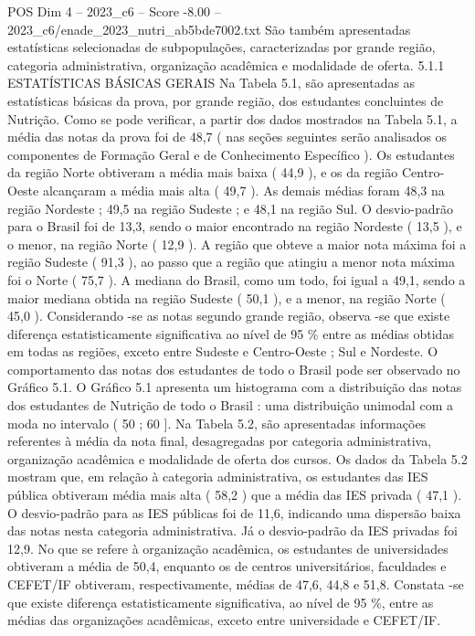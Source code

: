 \begin{textsample}{POS Dim 4 – 2023\_c6 – Score -8.00 – 2023\_c6/enade\_2023\_nutri\_ab5bde7002.txt}
São também apresentadas estatísticas selecionadas de subpopulações, caracterizadas por grande região, categoria administrativa, organização acadêmica e modalidade de oferta. 5.1.1 ESTATÍSTICAS BÁSICAS GERAIS Na Tabela 5.1, são apresentadas as estatísticas básicas da prova, por grande região, dos estudantes concluintes de Nutrição.
Como se pode verificar, a partir dos dados mostrados na Tabela 5.1, a média das notas da prova foi de 48,7 ( nas seções seguintes serão analisados os componentes de Formação Geral e de Conhecimento Específico ).
Os estudantes da região Norte obtiveram a média mais baixa ( 44,9 ), e os da região Centro-Oeste alcançaram a média mais alta ( 49,7 ).
As demais médias foram 48,3 na região Nordeste ; 49,5 na região Sudeste ; e 48,1 na região Sul.
O desvio-padrão para o Brasil foi de 13,3, sendo o maior encontrado na região Nordeste ( 13,5 ), e o menor, na região Norte ( 12,9 ).
A região que obteve a maior nota máxima foi a região Sudeste ( 91,3 ), ao passo que a região que atingiu a menor nota máxima foi o Norte ( 75,7 ).
A mediana do Brasil, como um todo, foi igual a 49,1, sendo a maior mediana obtida na região Sudeste ( 50,1 ), e a menor, na região Norte ( 45,0 ).
Considerando -se as notas segundo grande região, observa -se que existe diferença estatisticamente significativa ao nível de 95 \% entre as médias obtidas em todas as regiões, exceto entre Sudeste e Centro-Oeste ; Sul e Nordeste.
O comportamento das notas dos estudantes de todo o Brasil pode ser observado no Gráfico 5.1.
O Gráfico 5.1 apresenta um histograma com a distribuição das notas dos estudantes de Nutrição de todo o Brasil : uma distribuição unimodal com a moda no intervalo ( 50 ; 60 ].
Na Tabela 5.2, são apresentadas informações referentes à média da nota final, desagregadas por categoria administrativa, organização acadêmica e modalidade de oferta dos cursos.
Os dados da Tabela 5.2 mostram que, em relação à categoria administrativa, os estudantes das IES pública obtiveram média mais alta ( 58,2 ) que a média das IES privada ( 47,1 ).
O desvio-padrão para as IES públicas foi de 11,6, indicando uma dispersão baixa das notas nesta categoria administrativa.
Já o desvio-padrão da IES privadas foi 12,9.
No que se refere à organização acadêmica, os estudantes de universidades obtiveram a média de 50,4, enquanto os de centros universitários, faculdades e CEFET/IF obtiveram, respectivamente, médias de 47,6, 44,8 e 51,8.
Constata -se que existe diferença estatisticamente significativa, ao nível de 95 \%, entre as médias das organizações acadêmicas, exceto entre universidade e CEFET/IF.

\end{textsample}
